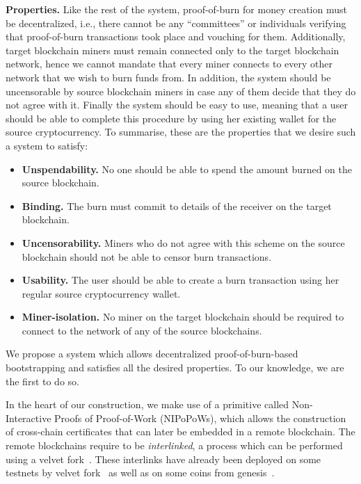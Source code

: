\noindent
\textbf{Properties.}
Like the rest of the system, proof-of-burn for money creation must be decentralized, i.e., there cannot be any ``committees'' or individuals verifying that proof-of-burn transactions took place and vouching for them. Additionally, target blockchain miners must remain connected only to the target blockchain network, hence we cannot mandate that every miner connects to every other network that we wish to burn funds from. In addition, the system should be uncensorable by source blockchain miners in case any of them decide that they do not agree with it. Finally the system should be easy to use, meaning that a user should be able to complete this procedure by using her existing wallet for the source cryptocurrency. To summarise, these are the properties that we desire such a system to satisfy:

\begin{itemize}
    \item \textbf{Unspendability.} No one should be able to spend the amount burned on the source blockchain.
    \item \textbf{Binding.} The burn must commit to details of the receiver on the target blockchain.
    \item \textbf{Uncensorability.} Miners who do not agree with this scheme on the source blockchain should not be able to censor burn transactions.
    \item \textbf{Usability.} The user should be able to create a burn transaction using her regular source cryptocurrency wallet.
    \item \textbf{Miner-isolation.} No miner on the target blockchain should be required to connect to the network of any of the source blockchains. %
\end{itemize}

We propose a system which allows decentralized proof-of-burn-based bootstrapping and satisfies all the desired properties. To our knowledge, we are the first to do so.

In the heart of our construction, we make use of a primitive called
Non-Interactive Proofs of Proof-of-Work (NIPoPoWs), which allows the
construction of cross-chain certificates that can later be embedded in a remote
blockchain. The remote blockchains require to be \emph{interlinked}, a process
which can be performed using a velvet fork~\cite{velvet}. These interlinks have
already been deployed on some testnets by velvet fork~\cite{gtklocker} as well
as on some coins from genesis~\cite{ergo}.

